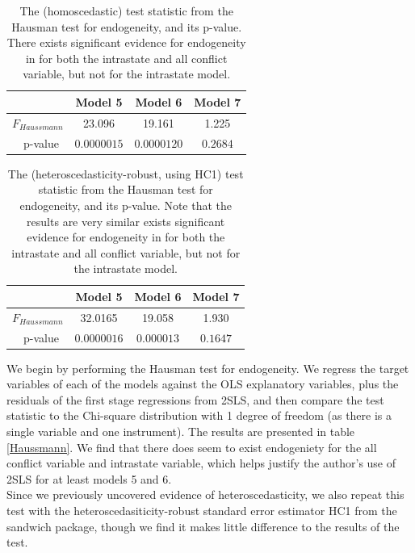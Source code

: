 \documentclass{article}
\begin{document}
\begin{table}
\center 
\begin{tabular}{| l | c | c | c|}
\hline
~ & Model 5 & Model 6 & Model 7 \\
\hline 

$F_{Haussmann}$ & 23.096 & 19.161 & 1.225 \\
~~p-value & $0.0000015$ & $0.0000120$ 
&$0.2684$\\
\hline
\end{tabular}
\label{Haussman}
\caption{The (homoscedastic) test statistic from the Hausman test for endogeneity, and its p-value. There exists significant evidence for endogeneity in for both the intrastate and all conflict variable, but not for the intrastate model. }
\end{table}

\begin{table}
\center 
\begin{tabular}{| l | c | c | c|}
\hline
~ & Model 5 & Model 6 & Model 7 \\
\hline 

$F_{Haussmann}$ & 32.0165 & 19.058 & 1.930 \\
~~p-value & $0.0000016$ & $0.000013$
&$0.1647$\\
\hline
\end{tabular}
\label{HaussmanHC}
\caption{The (heteroscedasticity-robust, using HC1) test statistic from the Hausman test for endogeneity, and its p-value. Note that the results are very similar  exists significant evidence for endogeneity in for both the intrastate and all conflict variable, but not for the intrastate model. }
\end{table}

We begin by performing the Hausman test for endogeneity. We regress the target variables of each of the models against the OLS explanatory variables, plus the residuals of the first stage regressions from 2SLS, and then compare the test statistic to the Chi-square distribution with 1 degree of freedom (as there is a single variable and one instrument). The results are presented in table \ref{Haussmann}. We find that there does seem to exist endogeniety for the all conflict variable and intrastate variable, which helps justify the author's use of 2SLS for at least models 5 and 6. \\

Since we previously uncovered evidence of heteroscedasticity, we also repeat this test with the heteroscedasiticity-robust standard error estimator HC1 from the sandwich package, though we find it makes little difference to the results of the test. \\
\end{document}
